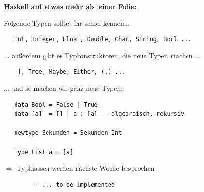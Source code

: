 \documentclass[unknownkeysallowed]{beamer}
\begin{document}
  
  \begin{frame}[fragile]
  
  \begin{center}
  \Large\textbf{\underline{Haskell auf \tiny etwas mehr als \,\Large einer Folie:}} \normalsize
  \end{center}
  
  Folgende Typen solltet ihr schon kennen...
  
  \begin{verbatim}
   Int, Integer, Float, Double, Char, String, Bool ...
  \end{verbatim}
  
  \pause
  
  ... außerdem gibt es Typkonstruktoren, die neue Typen machen ...
  
  \begin{verbatim}
   [], Tree, Maybe, Either, (,) ...
  \end{verbatim}
  
  \pause
  
  ... und so machen wir ganz neue Typen:

  \begin{verbatim}
   data Bool = False | True
   data [a]  = [] | a : [a] -- algebraisch, rekursiv
   
   newtype Sekunden = Sekunden Int
   
   type List a = [a]
  \end{verbatim}
  
  \pause
  $\Rightarrow$ Typklassen werden nächste Woche besprochen
  
\end{frame}  

  
  \begin{frame}[fragile]
  


  \begin{verbatim}
        -- ... to be implemented
  \end{verbatim}
\end{frame}
  
\end{document}
